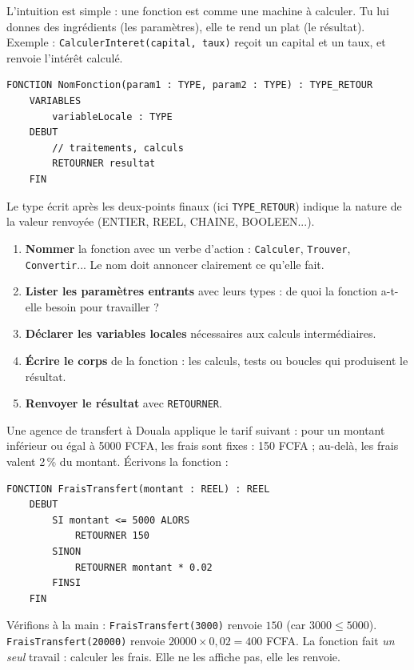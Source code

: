 \documentclass[11pt]{article}
\begin{document}
L'intuition est simple : une fonction est comme une machine à calculer. Tu lui donnes des ingrédients (les paramètres), elle te rend un plat (le résultat). Exemple : \texttt{CalculerInteret(capital, taux)} reçoit un capital et un taux, et renvoie l'intérêt calculé.

\begin{propriete}
\begin{lstlisting}
FONCTION NomFonction(param1 : TYPE, param2 : TYPE) : TYPE_RETOUR
    VARIABLES
        variableLocale : TYPE
    DEBUT
        // traitements, calculs
        RETOURNER resultat
    FIN
\end{lstlisting}
Le type écrit après les deux-points finaux (ici \texttt{TYPE\_RETOUR}) indique la nature de la valeur renvoyée (ENTIER, REEL, CHAINE, BOOLEEN...).
\end{propriete}

\begin{methode}
\begin{enumerate}
  \item \textbf{Nommer} la fonction avec un verbe d'action : \texttt{Calculer}, \texttt{Trouver}, \texttt{Convertir}... Le nom doit annoncer clairement ce qu'elle fait.
  \item \textbf{Lister les paramètres entrants} avec leurs types : de quoi la fonction a-t-elle besoin pour travailler ?
  \item \textbf{Déclarer les variables locales} nécessaires aux calculs intermédiaires.
  \item \textbf{Écrire le corps} de la fonction : les calculs, tests ou boucles qui produisent le résultat.
  \item \textbf{Renvoyer le résultat} avec \texttt{RETOURNER}.
\end{enumerate}
\end{methode}

\begin{exemplebox}
Une agence de transfert à Douala applique le tarif suivant : pour un montant inférieur ou égal à \num{5000} FCFA, les frais sont fixes : 150 FCFA ; au-delà, les frais valent 2\,\% du montant. Écrivons la fonction :
\begin{lstlisting}
FONCTION FraisTransfert(montant : REEL) : REEL
    DEBUT
        SI montant <= 5000 ALORS
            RETOURNER 150
        SINON
            RETOURNER montant * 0.02
        FINSI
    FIN
\end{lstlisting}
Vérifions à la main : \texttt{FraisTransfert(3000)} renvoie $150$ (car $3000 \leq 5000$). \texttt{FraisTransfert(20000)} renvoie $20000 \times 0{,}02 = 400$ FCFA. La fonction fait \emph{un seul} travail : calculer les frais. Elle ne les affiche pas, elle les renvoie.
\end{exemplebox}
\end{document}
